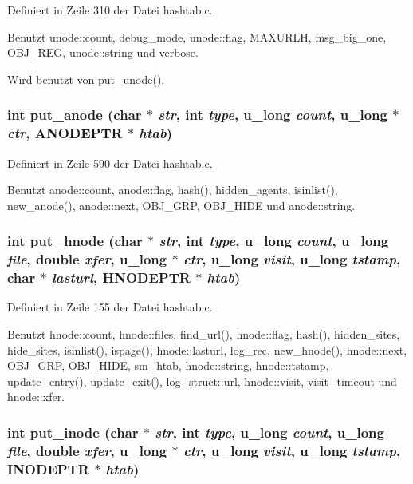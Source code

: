 Definiert in Zeile 310 der Datei hashtab.c.

Benutzt unode::count, debug\_\-mode, unode::flag, MAXURLH, msg\_\-big\_\-one, OBJ\_\-REG, unode::string und verbose.

Wird benutzt von put\_\-unode().
\subsubsection{\setlength{\rightskip}{0pt plus 5cm}int put\_\-anode (char $\ast$ {\em str}, int {\em type}, u\_\-long {\em count}, u\_\-long $\ast$ {\em ctr}, {\bf ANODEPTR} $\ast$ {\em htab})}\label{hashtab_8c_696c253a54bee8d869c852d86c1f145e}




Definiert in Zeile 590 der Datei hashtab.c.

Benutzt anode::count, anode::flag, hash(), hidden\_\-agents, isinlist(), new\_\-anode(), anode::next, OBJ\_\-GRP, OBJ\_\-HIDE und anode::string.
\subsubsection{\setlength{\rightskip}{0pt plus 5cm}int put\_\-hnode (char $\ast$ {\em str}, int {\em type}, u\_\-long {\em count}, u\_\-long {\em file}, double {\em xfer}, u\_\-long $\ast$ {\em ctr}, u\_\-long {\em visit}, u\_\-long {\em tstamp}, char $\ast$ {\em lasturl}, {\bf HNODEPTR} $\ast$ {\em htab})}\label{hashtab_8c_f2f25ed90b609c69446b8446454ca7a0}




Definiert in Zeile 155 der Datei hashtab.c.

Benutzt hnode::count, hnode::files, find\_\-url(), hnode::flag, hash(), hidden\_\-sites, hide\_\-sites, isinlist(), ispage(), hnode::lasturl, log\_\-rec, new\_\-hnode(), hnode::next, OBJ\_\-GRP, OBJ\_\-HIDE, sm\_\-htab, hnode::string, hnode::tstamp, update\_\-entry(), update\_\-exit(), log\_\-struct::url, hnode::visit, visit\_\-timeout und hnode::xfer.
\subsubsection{\setlength{\rightskip}{0pt plus 5cm}int put\_\-inode (char $\ast$ {\em str}, int {\em type}, u\_\-long {\em count}, u\_\-long {\em file}, double {\em xfer}, u\_\-long $\ast$ {\em ctr}, u\_\-long {\em visit}, u\_\-long {\em tstamp}, {\bf INODEPTR} $\ast$ {\em htab})}\label{hashtab_8c_9febd80a08973165c09cd1f42f429838}




